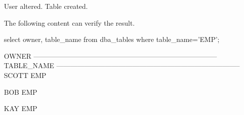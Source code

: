 \documentclass{article}
\begin{document}
\begin{enumerate}
\begin{messageshell}
User altered.
Table created.
\end{messageshell}
The following content can verify the result.
\begin{sqlshell}
select owner, table_name from dba_tables where table_name='EMP';
\end{sqlshell}
\begin{messageshell}
OWNER
--------------------------------------------------------------------------------
TABLE_NAME
--------------------------------------------------------------------------------
SCOTT
EMP

BOB
EMP

KAY
EMP
\end{messageshell}
\end{enumerate}
\end{document}
